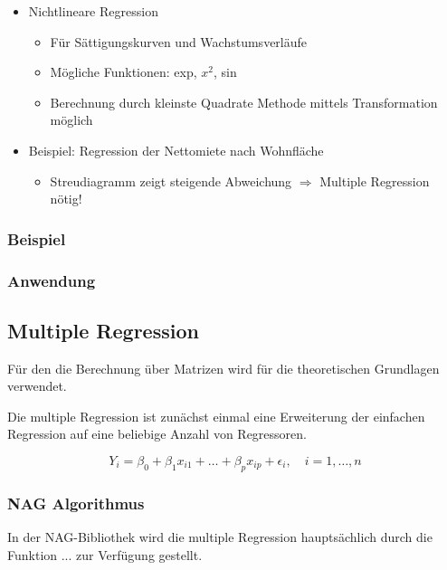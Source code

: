 \begin{itemize}
 \item Nichtlineare Regression
 \begin{itemize}
  \item Für Sättigungskurven und Wachstumsverläufe
  \item Mögliche Funktionen: exp, $x^2$, sin
  \item Berechnung durch kleinste Quadrate Methode mittels Transformation möglich
 \end{itemize}

 \item Beispiel: Regression der Nettomiete nach Wohnfläche
 \begin{itemize}
  \item Streudiagramm zeigt steigende Abweichung $\Rightarrow$ Multiple Regression nötig!
 \end{itemize}
\end{itemize}

\subsubsection{Beispiel}

\subsubsection{Anwendung}

\subsection{Multiple Regression}

Für den die Berechnung über Matrizen wird \cite{Fahrmeir1984} für die theoretischen Grundlagen verwendet.

Die multiple Regression ist zunächst einmal eine Erweiterung der einfachen Regression auf eine beliebige Anzahl von Regressoren.

\begin{equation}
  Y_i = \beta_0 + \beta_1 x_{i1} + \dots + \beta_p x_{ip} + \epsilon_i, \quad i = 1, \dots, n
\end{equation}



\subsubsection{NAG Algorithmus}

In der NAG-Bibliothek wird die multiple Regression hauptsächlich durch die Funktion ... zur Verfügung gestellt.
 

